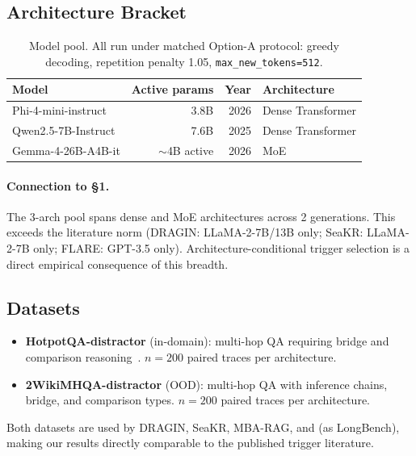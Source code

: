 \documentclass[11pt]{article}
\begin{document}
\subsection{Architecture Bracket}

\begin{table}[h]
\centering\small
\begin{tabular}{@{}lrrl@{}}
\toprule
\textbf{Model} & \textbf{Active params} & \textbf{Year} &
\textbf{Architecture} \\
\midrule
Phi-4-mini-instruct & 3.8B & 2026 & Dense Transformer \\
Qwen2.5-7B-Instruct & 7.6B & 2025 & Dense Transformer \\
Gemma-4-26B-A4B-it & $\sim$4B active & 2026 & MoE \\
\bottomrule
\end{tabular}
\caption{Model pool. All run under matched Option-A protocol: greedy
decoding, repetition penalty 1.05, \texttt{max\_new\_tokens=512}.}
\end{table}

\paragraph{Connection to \S1.} The 3-arch pool spans dense and MoE
architectures across 2 generations. This exceeds the literature norm
(DRAGIN: LLaMA-2-7B/13B only; SeaKR: LLaMA-2-7B only; FLARE:
GPT-3.5 only). Architecture-conditional trigger selection is a direct
empirical consequence of this breadth.


\subsection{Datasets}

\begin{itemize}
\item \textbf{HotpotQA-distractor} (in-domain): multi-hop QA
requiring bridge and comparison reasoning~\citep{Yang_HotpotQA}.
$n{=}200$ paired traces per architecture.
\item \textbf{2WikiMHQA-distractor} (OOD): multi-hop QA with
inference chains, bridge, and
comparison types. $n{=}200$ paired traces per architecture.
\end{itemize}

Both datasets are used by DRAGIN, SeaKR, MBA-RAG, and
\cite{Zhang_VerbosityVeracityVCBehavior} (as LongBench), making
our results directly comparable to the published trigger literature.
\end{document}
